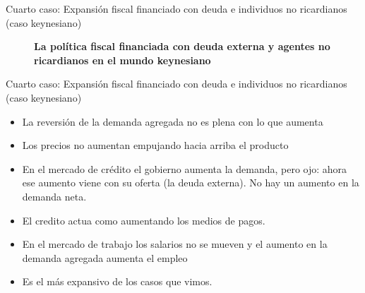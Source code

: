 \documentclass{beamer}
\begin{document}
\begin{frame}{Cuarto caso: Expansión fiscal financiado con deuda e individuos no ricardianos (caso keynesiano)}
\begin{center}
\begin{figure}[H]
\begin{center}
\end{center}
\vspace{0.7cm}
\caption{\textbf{La política fiscal financiada con deuda externa y agentes no ricardianos en el mundo keynesiano}}
\label{fig:C36.8}
\end{figure}
\end{center}


\end{frame}

\begin{frame}{Cuarto caso: Expansión fiscal financiado con deuda e individuos no ricardianos (caso keynesiano)}
   
   \begin{itemize}
       \item La reversión de la demanda agregada no es plena con lo que aumenta 
       \item Los precios no aumentan empujando hacia arriba el producto
       
        \item En el mercado de crédito el gobierno aumenta la demanda, pero ojo: ahora ese aumento viene con su oferta (la deuda externa). No hay un aumento en la demanda neta.
        \item El credito actua como aumentando los medios de pagos.
 
 \item En el mercado de trabajo los salarios no se mueven y el aumento en la demanda agregada aumenta el empleo 
 \item Es el más expansivo de los casos que vimos.
   \end{itemize}
    
\end{frame}
\end{document}
